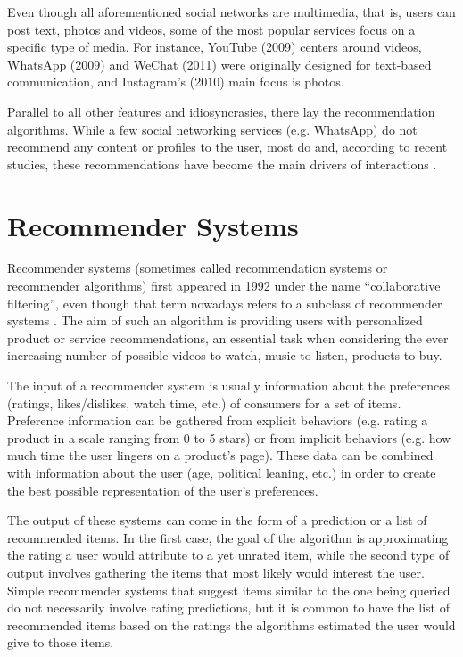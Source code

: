 Even though all aforementioned social networks are multimedia, that is, users
can post text, photos and videos, some of the most popular services focus on a
specific type of media. For instance, YouTube (2009) centers around videos,
WhatsApp (2009) and WeChat (2011) were originally designed for text-based
communication, and Instagram's (2010) main focus is photos.

Parallel to all other features and idiosyncrasies, there lay the recommendation
algorithms. While a few social networking services (e.g. WhatsApp) do not
recommend any content or profiles to the user, most do and, according to recent
studies, these recommendations have become the main drivers of interactions
\citep{}. %

\section{Recommender Systems}
\label{sec:recommender_systems}

Recommender systems (sometimes called recommendation systems or recommender
algorithms) first appeared in 1992 under the name ``collaborative filtering'',
even though that term nowadays refers to a subclass of recommender systems
\citep{goldberg_using_1992}. The aim of such an algorithm is providing users
with personalized product or service recommendations, an essential task when
considering the ever increasing number of possible videos to watch, music to
listen, products to buy.

The input of a recommender system is usually information about the preferences
(ratings, likes/dislikes, watch time, etc.) of consumers for a set of items.
Preference information can be gathered from explicit behaviors (e.g. rating a
product in a scale ranging from 0 to 5 stars) or from implicit behaviors (e.g.
how much time the user lingers on a product's page). These data can be combined
with information about the user (age, political leaning, etc.) in order to
create the best possible representation of the user's preferences.

The output of these systems can come in the form of a prediction or a list of
recommended items. In the first case, the goal of the algorithm is approximating
the rating a user would attribute to a yet unrated item, while the second type
of output involves gathering the items that most likely would interest the user.
Simple recommender systems that suggest items similar to the one being queried
do not necessarily involve rating predictions, but it is common to have the list
of recommended items based on the ratings the algorithms estimated the user
would give to those items.

